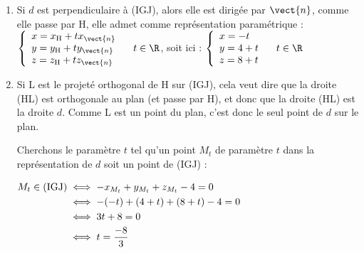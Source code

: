\begin{enumerate}
\begin{enumerate}
Ainsi, $\vect{n}$ est orthogonal à deux vecteurs non colinéaires du plan (IGJ) : c'est donc un vecteur normal au plan.

	\item Une équation cartésienne d'un plan dont $ \vect{n} $ est un vecteur normal est de la forme : \linebreak$-1\times x + 1 \times y + 1\times z + d =0$, soit $-x+y+z+d=0$, où $d$ est un réel quelconque.

Comme G est un point du plan (IGJ), on en déduit que la constante $d$ dans ce cas doit être telle que :

$\aligned -x_\mathrm{G} +y_\mathrm{G}+z_\mathrm{G} +d=0 &\iff -4+4+4+d = 0\\&\iff d = -4\\ \endaligned$

Une équation de (IGJ) est donc : $-x + y + z - 4 = 0$.
	\end{enumerate}
\item Si $d$ est perpendiculaire à (IGJ), alors elle est dirigée par $\vect{n}$, comme elle passe par H, elle admet comme représentation paramétrique : $ \left\{\begin{array}{l} x=x_\mathrm{H} + tx_{\vect{n}}\\y=y_\mathrm{H} + ty_{\vect{n}}\\z=z_\mathrm{H} + tz_{\vect{n}} \end{array}\right. \quad t \in \R $, soit ici : $ \left\{\begin{array}{l} x=-t\\y=4 + t\\z=8+t \end{array}\right. \quad t \in \R $

\item Si L est le projeté orthogonal de H sur (IGJ), cela veut dire que la droite (HL) est orthogonale au plan (et passe par H), et donc que la droite (HL) est la droite $d$. Comme L est un point du plan, c'est donc le seul point de $d$ sur le plan.

Cherchons le paramètre $t$ tel qu'un point $M_t$ de paramètre $t$ dans la représentation de $d$ soit un point de (IGJ) :

$\aligned M_t \in (\mathrm{IGJ}) &\iff -x_{M_t} + y_{M_t}+z_{M_t} - 4 = 0\\
&\iff -(-t) + (4+t) + (8 + t) - 4 = 0\\
&\iff 3t +8 = 0\\
&\iff t = \dfrac{-8}{3}\\ \endaligned$


\end{enumerate}
